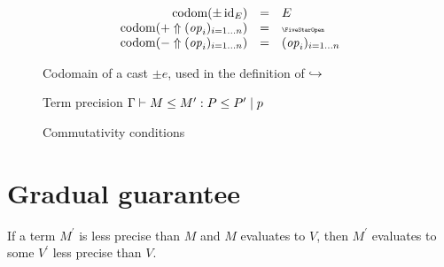\begin{figure}
\[
\begin{array}{rcl}
  \codom{\pm\, \effid_E} & = & E \\
  \codom{+ \Uparrow \fori{i}{n}{\effop_i}} & = & \effany \\
  \codom{- \Uparrow \fori{i}{n}{\effop_i}} & = & \fori{i}{n}{\effop_i}
\end{array}
\]
\caption{Codomain of a cast $\pm e$, used in the definition of $\stepperform$}
\end{figure}

\begin{figure}
\begin{prooftree}
\end{prooftree}
\begin{prooftree}
\end{prooftree}
\caption{Term precision $\TermP{\Gamma}{M}{P}{M^\prime}{P^\prime}{p}$}
\end{figure}

\begin{figure}
\begin{prooftree}
\end{prooftree}
\begin{prooftree}
\end{prooftree}
\begin{prooftree}
\end{prooftree}
\begin{prooftree}
\end{prooftree}
\caption{Commutativity conditions}
\end{figure}

\clearpage

\section{Gradual guarantee}

If a term $M^\prime$ is less precise than $M$ and $M$ evaluates to $V$,
then $M^\prime$ evaluates to some $V^\prime$ less precise than $V$.

